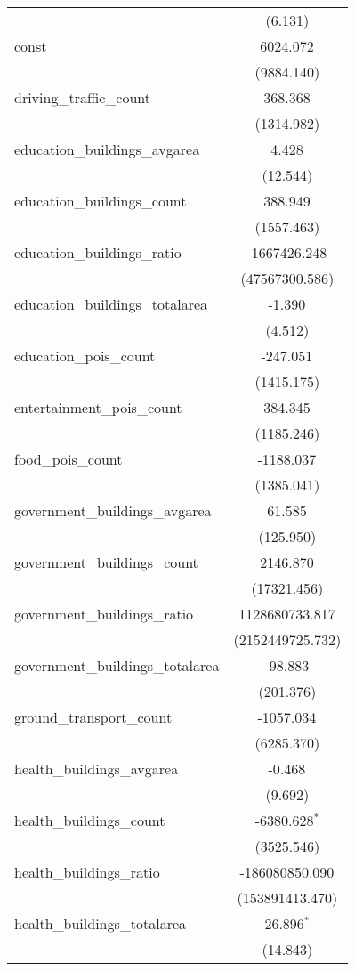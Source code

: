 \begin{table}[!htbp]
\begin{tabular}{@{\extracolsep{5pt}}lc}
  & (6.131) \\
 const & 6024.072$^{}$ \\
  & (9884.140) \\
 driving_traffic_count & 368.368$^{}$ \\
  & (1314.982) \\
 education_buildings_avgarea & 4.428$^{}$ \\
  & (12.544) \\
 education_buildings_count & 388.949$^{}$ \\
  & (1557.463) \\
 education_buildings_ratio & -1667426.248$^{}$ \\
  & (47567300.586) \\
 education_buildings_totalarea & -1.390$^{}$ \\
  & (4.512) \\
 education_pois_count & -247.051$^{}$ \\
  & (1415.175) \\
 entertainment_pois_count & 384.345$^{}$ \\
  & (1185.246) \\
 food_pois_count & -1188.037$^{}$ \\
  & (1385.041) \\
 government_buildings_avgarea & 61.585$^{}$ \\
  & (125.950) \\
 government_buildings_count & 2146.870$^{}$ \\
  & (17321.456) \\
 government_buildings_ratio & 1128680733.817$^{}$ \\
  & (2152449725.732) \\
 government_buildings_totalarea & -98.883$^{}$ \\
  & (201.376) \\
 ground_transport_count & -1057.034$^{}$ \\
  & (6285.370) \\
 health_buildings_avgarea & -0.468$^{}$ \\
  & (9.692) \\
 health_buildings_count & -6380.628$^{*}$ \\
  & (3525.546) \\
 health_buildings_ratio & -186080850.090$^{}$ \\
  & (153891413.470) \\
 health_buildings_totalarea & 26.896$^{*}$ \\
  & (14.843) \\

\end{tabular}
\end{table}
